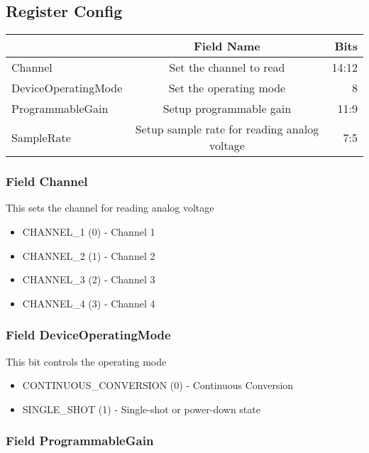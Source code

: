 \documentclass[a4paper,12pt,oneside,pdflatex,italian,final,twocolumn]{article}
\begin{document}
 


\raggedright

\subsection{Register Config}
\centering
\begin{tabular}{lcr}
\toprule
  & Field Name & Bits \\
\midrule
Channel & Set the channel to read & 
14:12
\\
DeviceOperatingMode & Set the operating mode & 
8
\\
ProgrammableGain & Setup programmable gain & 
11:9
\\
SampleRate & Setup sample rate for reading analog voltage & 
7:5
\\
\bottomrule

\end{tabular}


\raggedright

\subsubsection{Field Channel }

This sets the channel for reading analog voltage


\begin{itemize}
\item CHANNEL\_1 (0) - Channel 1
\item CHANNEL\_2 (1) - Channel 2
\item CHANNEL\_3 (2) - Channel 3
\item CHANNEL\_4 (3) - Channel 4
\end{itemize}


\raggedright

\subsubsection{Field DeviceOperatingMode }

This bit controls the operating mode


\begin{itemize}
\item CONTINUOUS\_CONVERSION (0) - Continuous Conversion
\item SINGLE\_SHOT (1) - Single-shot or power-down state
\end{itemize}


\raggedright

\subsubsection{Field ProgrammableGain }
\end{document}
